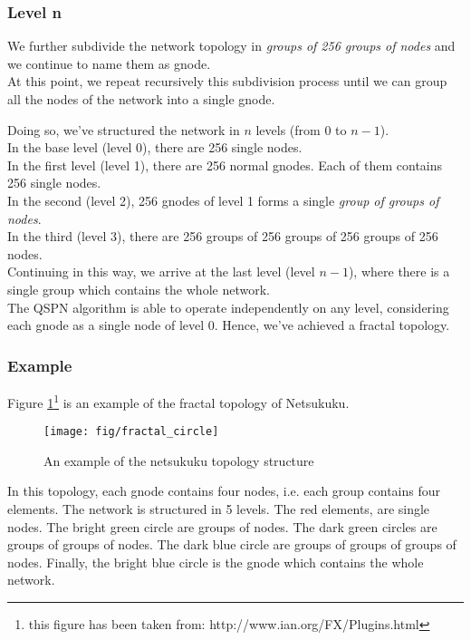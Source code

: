 \documentclass[a4paper]{article}
\newcommand{\href}[2]{ #1 }
\begin{document}
\subsubsection{Level n}
We further subdivide the network topology in \emph{groups of 256 groups of nodes}
and we continue to name them as gnode.\\
At this point, we repeat recursively this subdivision process until
we can group all the nodes of the network into a single gnode.

Doing so, we've structured the network in $n$ levels (from $0$ to $n-1$).\\
In the base level (level 0), there are 256 single nodes.\\
In the first level (level 1), there are 256 normal gnodes. Each of them
contains 256 single nodes.\\
In the second (level 2), 256 gnodes of level 1 forms a single \emph{group of
groups of nodes}.\\
In the third (level 3), there are 256 groups of 256 groups of 256 groups of
256 nodes.\\
Continuing in this way, we arrive at the last level (level $n-1$), where there
is a single group which contains the whole network.\\

The QSPN algorithm is able to operate independently on any level,
considering each gnode as a single node of level 0.
Hence, we've achieved a fractal topology.

\subsubsection*{Example}

Figure \ref{fig:fract_circle}\footnote{this figure has been taken from:
\href{http://www.ian.org/FX/Plugins.html}{http://www.ian.org/FX/Plugins.html}}
is an example of the fractal topology of Netsukuku.

\begin{figure}[h]
	\begin{center}
		\texttt{[image: fig/fractal\_circle]}
	\end{center}
	\caption{An example of the netsukuku topology structure}
	\label{fig:fract_circle}
\end{figure}

In this topology, each gnode contains four nodes, i.e. each group contains
four elements. The network is structured in 5 levels. The red elements, are single
nodes. The bright green circle are groups of nodes. The dark green circles are
groups of groups of nodes. The dark blue circle are groups of groups of groups of
nodes. Finally, the bright blue circle is the gnode which contains the whole
network.
\end{document}
